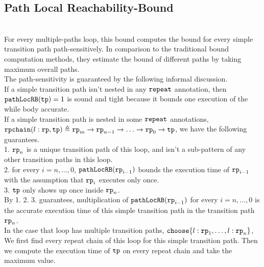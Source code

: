 \subsection{Path Local Reachability-Bound}
  \\
  For every multiple-paths loop,
  this bound computes the bound for every simple transition path path-sensitively.
  In comparison to the traditional bound computation methods, they
  estimate the bound of different paths by taking maximum overall paths.
  \\
  The path-sensitivity is guaranteed by the following informal discussion.
  \\
  If a simple transition path isn't nested in any $\mathtt{repeat}$ annotation, then
  $\mathtt{pathLocRB}(\mathtt{tp}) = 1$ is sound and tight because it bounds one execution of the while body accurate.
  \\
  If a simple transition path is nested in some $\mathtt{repeat}$ annotations,
  $\mathtt{rpchain}(l: \mathtt{rp}, \mathtt{tp}) \triangleq \mathtt{rp}_m \to \mathtt{rp}_{n-1} \to \ldots \to \mathtt{rp}_{0} \to \mathtt{tp}$, we have the following guarantees.
  \\
  1. $\mathtt{rp}_n$ is a unique transition path of this loop,
  and isn't a sub-pattern of any other transition paths in this loop.
  \\
  2. for every $i = n, \ldots, 0$, $\mathtt{pathLocRB}(\mathtt{rp}_{i - 1})$ bounds the execution time of $\mathtt{rp}_{i - 1}$ with the assumption that $\mathtt{rp}_{i}$ executes only once.
  \\
  3. $\mathtt{tp}$ only shows up once inside $\mathtt{rp}_n$.
  \\
  By 1. 2. 3. guarantees, multiplication of $\mathtt{pathLocRB}(\mathtt{rp}_{i - 1})$ for every $i = n, \ldots, 0$ is the accurate execution time of this
  simple transition path in the transition path $\mathtt{rp}_n$.
  \\
  In the case that loop has multiple transition paths, $\rpchoose{l: \rprog_1, \ldots, l: \rprog_n}$,
  \\
  We first find every repeat chain of this loop for this simple transition path.
  Then we compute the execution time of $\mathtt{tp}$ on every repeat chain and take the maximum value.

